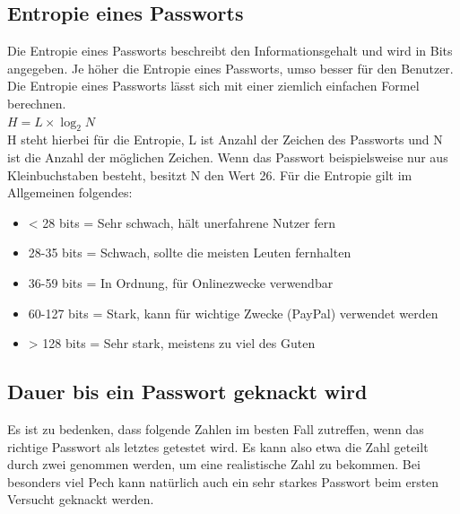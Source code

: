 \documentclass[12pt,a4paper]{scrreprt}
\begin{document}
\subsection{Entropie eines Passworts}
Die Entropie eines Passworts beschreibt den Informationsgehalt und wird in Bits angegeben. Je höher die Entropie eines Passworts, umso besser für den Benutzer. Die Entropie eines Passworts lässt sich mit einer ziemlich einfachen Formel berechnen.\\

\noindent $H = L\times\log_2N$\\

\noindent H steht hierbei für die Entropie, L ist Anzahl der Zeichen des Passworts und N ist die Anzahl der möglichen Zeichen. Wenn das Passwort beispielsweise nur aus Kleinbuchstaben besteht, besitzt N den Wert 26. Für die Entropie gilt im Allgemeinen folgendes:\\

\begin{itemize}
\item < 28 bits = Sehr schwach, hält unerfahrene Nutzer fern
\item 28-35 bits = Schwach, sollte die meisten Leuten fernhalten
\item 36-59 bits = In Ordnung, für Onlinezwecke verwendbar
\item 60-127 bits = Stark, kann für wichtige Zwecke (PayPal) verwendet werden
\item > 128 bits = Sehr stark, meistens zu viel des Guten
\end{itemize}

\subsection{Dauer bis ein Passwort geknackt wird}
Es ist zu bedenken, dass folgende Zahlen im besten Fall zutreffen, wenn das richtige Passwort als letztes getestet wird. Es kann also etwa die Zahl geteilt durch zwei genommen werden, um eine realistische Zahl zu bekommen. Bei besonders viel Pech kann natürlich auch ein sehr starkes Passwort beim ersten Versucht geknackt werden.\\
\end{document}
